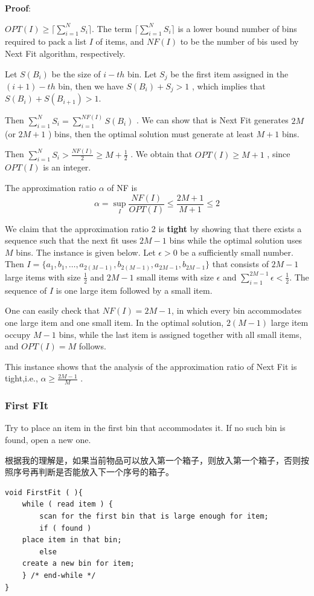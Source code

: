 \documentclass{article}
\begin{document}
\textbf{Proof}:\par
$ OPT(I) \ge \lceil \sum\limits_{i=1}^N S_i \rceil$. The term $\lceil \sum\limits_{i=1}^{N} S_i \rceil$ is a lower bound number of bins required to pack a list $I$ of items, and $NF(I)$ to be the number of bis used by Next Fit algorithm, respectively.\par
Let $S(B_i)$ be the size of $i-th$ bin. Let $S_j$ be the first item assigned in the $(i+1)-th$ bin, then we have $S(B_i)+S_j > 1$ , which implies that $S(B_i)+S(B_{i+1}) > 1$. \par
Then $\sum\limits_{i=1}^{N} S_i = \sum\limits_{i=1}^{NF(I)}S(B_i)$ . We can show that is Next Fit generates $2M$ (or $2M+1$ ) bins, then the optimal solution must generate at least $M+1$ bins. \par
Then $\sum\limits_{i=1}^{N} S_i > \frac{NF(I)}{2} \ge M+\frac{1}{2}$ . We obtain that $OPT(I) \ge M+1$ , since $OPT(I)$ is an integer.\par
The approximation ratio $\alpha$ of NF is
$$\alpha = \mathop{sup}\limits_I \frac{NF(I)}{OPT(I)} \le \frac{2M+1}{M+1} \le 2$$\par
We claim that the approximation ratio 2 is \textbf{tight} by showing that there exists a sequence such that the next fit uses $2M-1$ bins while the optimal solution uses $M$ bins. The instance is given below. Let $\epsilon > 0$ be a sufficiently small number. Then $I = \{ a_1,b_1,\dots,a_{2(M-1)},b_{2(M-1)},a_{2M-1},b_{2M-1}\}$ that consists of $2M-1$ large items with size $\frac{1}{2}$ and $2M-1$ small items with size $\epsilon$ and $\sum\limits_{i=1}^{2M-1} \epsilon < \frac{1}{2}$. The sequence of $I$ is one large item followed by a small item.\par
One can easily check that $NF(I)=2M-1$, in which every bin accommodates one large item and one small item. In the optimal solution, $2(M-1)$ large item occupy $M-1$ bins, while the last item is assigned together with all small items, and $OPT(I) = M$ follows.\par
This instance shows that the analysis of the approximation ratio of Next Fit is tight,i.e., $\alpha \ge \frac{2M-1}{M}$ .

\subsubsection{First FIt}
Try to place an item in the first bin that accommodates it. If no such bin is found, open a new one.\par
根据我的理解是，如果当前物品可以放入第一个箱子，则放入第一个箱子，否则按照序号再判断是否能放入下一个序号的箱子。
\begin{lstlisting}
void FirstFit ( ){
    while ( read item ) {
        scan for the first bin that is large enough for item;
        if ( found )
    place item in that bin;
        else
    create a new bin for item;
    } /* end-while */
}
\end{lstlisting}
\end{document}
